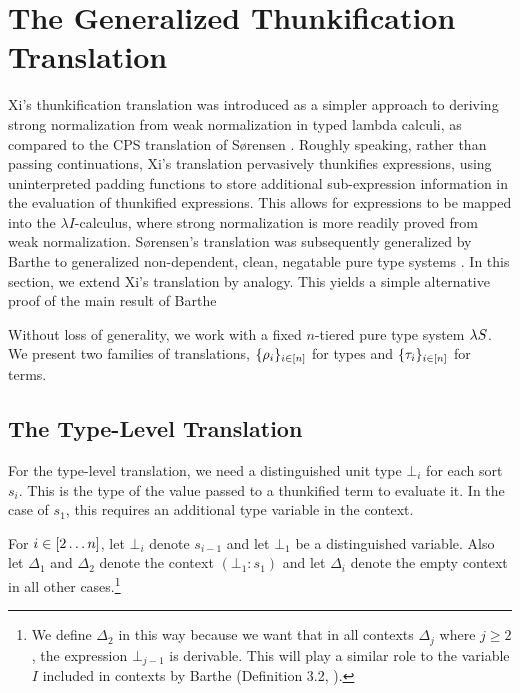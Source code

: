 \documentclass{article}
\begin{document}
\section{The Generalized Thunkification Translation}

Xi's thunkification translation \cite{xi-1997} was introduced as a simpler approach to deriving strong normalization from weak normalization in typed lambda calculi, as compared to the CPS translation of S{\o}rensen \cite{sorensen-1997}.
Roughly speaking, rather than passing continuations, Xi's translation pervasively thunkifies expressions, using uninterpreted padding functions to store additional sub-expression information in the evaluation of thunkified expressions.
This allows for expressions to be mapped into the $\lambda I$-calculus, where strong normalization is more readily proved from weak normalization.
S{\o}rensen's translation was subsequently generalized by Barthe \etal to generalized non-dependent, clean, negatable pure type systems \cite{barthe-et-al-2001}.
In this section, we extend Xi's translation by analogy.
This yields a simple alternative proof of the main result of Barthe \etal

Without loss of generality, we work with a fixed $n$-tiered pure type system $\lambda S$.
We present two families of translations, $\{\rho_i\}_{i \in [n]}$ for types and $\{\tau_i\}_{i \in [n]}$ for terms.

\subsection{The Type-Level Translation}

For the type-level translation, we need a distinguished unit type $\bot_i$ for each sort $s_i$.
This is the type of the value passed to a thunkified term to evaluate it.
In the case of $s_1$, this requires an additional type variable in the context.

\begin{definition}
For $i \in [2\dots n]$, let $\bot_i$ denote $s_{i - 1}$ and let $\bot_1$ be a distinguished variable.
Also let $\Delta_1$ and $\Delta_2$ denote the context $(\bot_1 : s_1)$ and let $\Delta_i$ denote the empty context in all other cases.\footnote{We define $\Delta_2$ in this way because we want that in all contexts $\Delta_j$ where $j \geq 2$, the expression $\bot_{j - 1}$ is derivable. This will play a similar role to the variable $I$ included in contexts by Barthe \etal (Definition 3.2, \cite{barthe-et-al-2001}).}
\end{definition}
\end{document}
